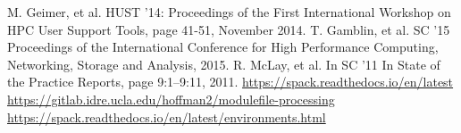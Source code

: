 \documentclass[conference]{IEEEtran}
\begin{document}
\begin{thebibliography}{00}
 M. Geimer, et al. HUST '14: Proceedings of the First International Workshop on HPC User Support Tools, page 41-51, November 2014.
 T. Gamblin, et al. SC ’15 Proceedings of the International Conference for High Performance Computing, Networking, Storage and Analysis, 2015.
 R. McLay, et al. In SC ’11 In State of the Practice Reports, page 9:1–9:11, 2011.
 \href{https://spack.readthedocs.io/en/latest}{https://spack.readthedocs.io/en/latest}
 \href{https://gitlab.idre.ucla.edu/hoffman2/modulefile-processing}{https://gitlab.idre.ucla.edu/hoffman2/modulefile-processing}
 \href{https://spack.readthedocs.io/en/latest/environments.html}{https://spack.readthedocs.io/en/latest/environments.html}
\end{thebibliography}
\end{document}
